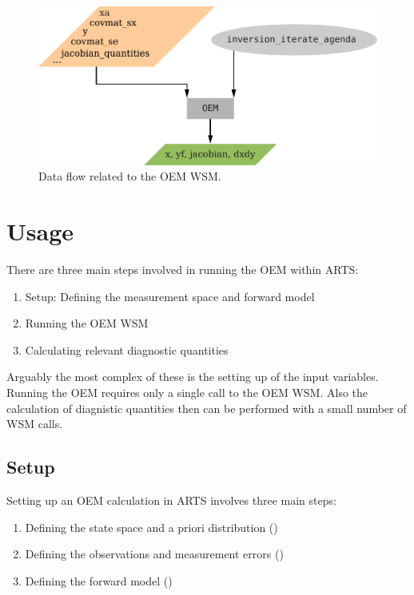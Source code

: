 \begin{figure}[!h]
  \begin{center}
   \includegraphics*[width=0.75\hsize, angle=0]{oem_flow}
  \end{center}
  \caption[OEM]{Data flow related to the OEM WSM.}
 \label{fig:oem_flow}
\end{figure}

\section{Usage}

There are three main steps involved in running the OEM within ARTS:
\begin{enumerate}
 \item Setup: Defining the measurement space and forward model
 \item Running the OEM WSM
 \item Calculating relevant diagnostic quantities
\end{enumerate}

Arguably the most complex of these is the setting up of the input variables.
Running the OEM requires only a single call to the OEM WSM. Also the calculation
of diagnistic quantities then can be performed with a small number of WSM calls.

\subsection{Setup}

Setting up an OEM calculation in ARTS involves three main steps:
\begin{enumerate}
  \item Defining the state space and a priori distribution ()
  \item Defining the observations and measurement errors ()
  \item Defining the forward model ()
\end{enumerate}


